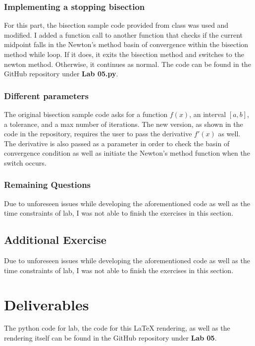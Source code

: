 \documentclass{article}
\begin{document}
\subsubsection{Implementing a stopping bisection}
For this part, the bisection sample code provided from class was used and modified. I added a function call to another function that checks if the current midpoint falls in the Newton's method basin of convergence within the bisection method while loop. If it does, it exits the bisection method and switches to the newton method. Otherwise, it continues as normal. The code can be found in the GitHub repository under \textbf{Lab 05.py}.

\subsubsection{Different parameters}
The original bisection sample code asks for a function \(f(x)\), an interval \([a,b]\), a tolerance, and a max number of iterations. The new version, as shown in the code in the repository, requires the user to pass the derivative \(f'(x)\) as well. The derivative is also passed as a parameter in order to check the basin of convergence condition as well as initiate the Newton's method function when the switch occurs.

\subsubsection{Remaining Questions}
Due to unforeseen issues while developing the aforementioned code as well as the time constraints of lab, I was not able to finish the exercises in this section.

\subsection{Additional Exercise}
Due to unforeseen issues while developing the aforementioned code as well as the time constraints of lab, I was not able to finish the exercises in this section.

\section{Deliverables}
The python code for lab, the code for this LaTeX rendering, as well as the rendering itself can be found in the GitHub repository under \textbf{Lab 05}.
\end{document}
